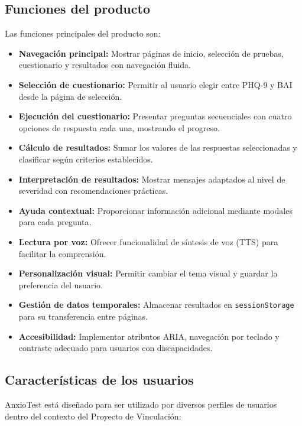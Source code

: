 \subsection{Funciones del producto}
\label{sec:funciones_producto}

Las funciones principales del producto son:

\begin{itemize}
  \item \textbf{Navegación principal:} Mostrar páginas de inicio, selección de pruebas, cuestionario y resultados con navegación fluida.
  \item \textbf{Selección de cuestionario:} Permitir al usuario elegir entre PHQ-9 y BAI desde la página de selección.
  \item \textbf{Ejecución del cuestionario:} Presentar preguntas secuenciales con cuatro opciones de respuesta cada una, mostrando el progreso.
  \item \textbf{Cálculo de resultados:} Sumar los valores de las respuestas seleccionadas y clasificar según criterios establecidos.
  \item \textbf{Interpretación de resultados:} Mostrar mensajes adaptados al nivel de severidad con recomendaciones prácticas.
  \item \textbf{Ayuda contextual:} Proporcionar información adicional mediante modales para cada pregunta.
  \item \textbf{Lectura por voz:} Ofrecer funcionalidad de síntesis de voz (TTS) para facilitar la comprensión.
  \item \textbf{Personalización visual:} Permitir cambiar el tema visual y guardar la preferencia del usuario.
  \item \textbf{Gestión de datos temporales:} Almacenar resultados en \texttt{sessionStorage} para su transferencia entre páginas.
  \item \textbf{Accesibilidad:} Implementar atributos ARIA, navegación por teclado y contraste adecuado para usuarios con discapacidades.
\end{itemize}

\subsection{Características de los usuarios}
\label{sec:caracteristicas_usuarios}

AnxioTest está diseñado para ser utilizado por diversos perfiles de usuarios dentro del contexto del Proyecto de Vinculación:

